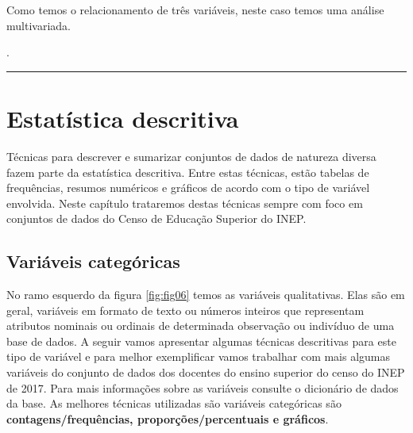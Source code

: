 \documentclass[11pt,]{style/krantz}
\makeatletter
\newenvironment{Shaded}{\begin{snugshade}}{\end{snugshade}}
\newcommand{\NormalTok}[1]{#1}
\newenvironment{kframe}{%
\medskip{}
\setlength{\fboxsep}{.8em}
 \def\at@end@of@kframe{}%
 \ifinner\ifhmode%
  \def\at@end@of@kframe{\end{minipage}}%
  \begin{minipage}{\columnwidth}%
 \fi\fi%
 \def\FrameCommand##1{\hskip\@totalleftmargin \hskip-\fboxsep
 \colorbox{shadecolor}{##1}\hskip-\fboxsep
     \hskip-\linewidth \hskip-\@totalleftmargin \hskip\columnwidth}%
 \MakeFramed {\advance\hsize-\width
   \@totalleftmargin\z@ \linewidth\hsize
   \@setminipage}}%
 {\par\unskip\endMakeFramed%
 \at@end@of@kframe}
\renewenvironment{Shaded}{\begin{kframe}}{\end{kframe}}
\theoremstyle{definition}
\theoremstyle{definition}
\theoremstyle{definition}
\theoremstyle{remark}
\let\BeginKnitrBlock\begin \let\EndKnitrBlock\end
\makeatother
\begin{document}
\BeginKnitrBlock{solution}
\iffalse{} {Solução. } \fi{}Como temos o relacionamento de três variáveis, neste caso temos uma análise multivariada.
\EndKnitrBlock{solution}

\begin{Shaded}
\begin{Highlighting}[]
\NormalTok{.}
\end{Highlighting}
\end{Shaded}

\begin{center}\rule{0.5\linewidth}{\linethickness}\end{center}

\pagebreak

\hypertarget{estatistica-descritiva}{%
\chapter{Estatística descritiva}\label{estatistica-descritiva}}

Técnicas para descrever e sumarizar conjuntos de dados de natureza diversa fazem parte da estatística descritiva. Entre estas técnicas, estão tabelas de frequências, resumos numéricos e gráficos de acordo com o tipo de variável envolvida. Neste capítulo trataremos destas técnicas sempre com foco em conjuntos de dados do Censo de Educação Superior do INEP.

\hypertarget{variaveis-categoricas}{%
\section{Variáveis categóricas}\label{variaveis-categoricas}}

No ramo esquerdo da figura \ref{fig:fig06} temos as variáveis qualitativas. Elas são em geral, variáveis em formato de texto ou números inteiros que representam atributos nominais ou ordinais de determinada observação ou indivíduo de uma base de dados. A seguir vamos apresentar algumas técnicas descritivas para este tipo de variável e para melhor exemplificar vamos trabalhar com mais algumas variáveis do conjunto de dados dos docentes do ensino superior do censo do INEP de 2017. Para mais informações sobre as variáveis consulte o dicionário de dados da base. As melhores técnicas utilizadas são variáveis categóricas são \textbf{contagens/frequências, proporções/percentuais e gráficos}.
\end{document}
